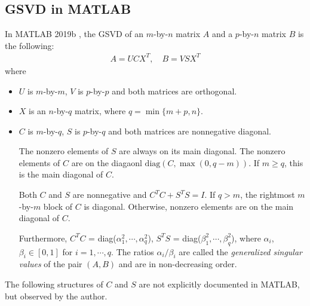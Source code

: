 \subsection{GSVD in MATLAB} \label{def_mat}
In MATLAB 2019b \cite{MATLAB:2019}, the GSVD of an $m$-by-$n$ matrix $A$ 
and a $p$-by-$n$ matrix $B$ is the following:
\begin{align}  \label{eq:gsvdbymatlab} 
A = UCX^T, \quad B = VSX^T
\end{align}
where 
\begin{itemize}
\item $U$ is $m$-by-$m$, $V$ is $p$-by-$p$ and both matrices are orthogonal.

\item $X$ is an $n$-by-$q$ matrix, where $q = \min\{m + p, n\}$. 

\item $C$ is $m$-by-$q$, 
$S$ is $p$-by-$q$ and both matrices are nonnegative diagonal.

The nonzero elements of $S$ are always on its main diagonal. 
The nonzero elements of $C$ are on the diagaonl 
$\mbox{diag}(C, \max(0,q-m))$. If $m \geq q$, this is the main diagonal of
$C$. 

Both $C$ and $S$ are nonnegative and $C^T C + S^T S = I$. 
If $q > m$, the rightmost $m$-by-$m$ block of $C$ is diagonal. 
Otherwise, nonzero elements are on the main diagonal of $C$.

Furthermore, $C^T C $ = diag($\alpha_1^{2}, \cdots, \alpha_q^{2}$), 
$S^T S$ = diag($\beta_1^{2}, \cdots, \beta_q^{2}$), 
where $\alpha_i$, $\beta_i \in [0, 1]$ for $i = 1,\cdots, q$. 
The ratios $\alpha_i/\beta_i$ are called the 
{\em generalized singular values} of the pair $(A, B)$ 
and are in non-decreasing order.

\end{itemize}
The following structures of $C$ and $S$ are not explicitly 
documented in MATLAB, but observed by the author.
